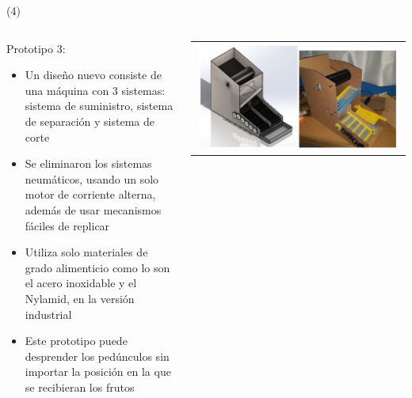 \begin{frame}{ (4)}
\begin{columns}
\begin{column}{0.60\textwidth}
Prototipo 3:
\begin{itemize}
    \item Un diseño nuevo consiste de una máquina con 3 sistemas: sistema de suministro, sistema de separación y sistema de corte    
    \item Se eliminaron los sistemas neumáticos, usando un solo motor de corriente alterna, además de usar mecanismos fáciles de replicar
    \item Utiliza solo materiales de grado alimenticio como lo son el acero inoxidable y el Nylamid, en la versión industrial
    \item Este prototipo puede desprender los pedúnculos sin importar la posición en la que se recibieran los frutos
	\end{itemize}
\end{column}
\begin{column}{0.40\textwidth}  
\begin{center}
     \begin{tabular}{c}
         \includegraphics[width=0.98\textwidth]{2022_MaquinaChilePiquin/figs/Prototipo3.png}\\
          \end{tabular}
\end{center}
\end{column} 
\end{columns} 
\end{frame}


